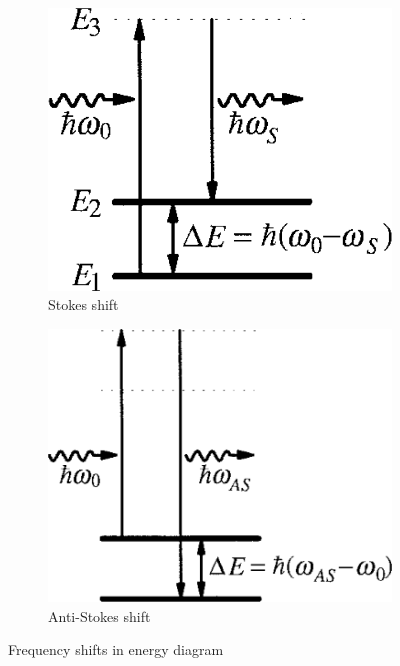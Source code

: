 \documentclass{standalone}
\begin{document}
\begin{figure}[h]
	\centering
	\begin{subfigure}[b]{0.35\textwidth}
		\includegraphics[width=\textwidth]{freq_shift_stokes.png}
		\caption{Stokes shift}
	\end{subfigure}
	\begin{subfigure}[b]{0.35\textwidth}
		\includegraphics[width=\textwidth]{freq_shift_antistokes.png}
		\caption{Anti-Stokes shift}
	\end{subfigure}
	\caption{Frequency shifts in energy diagram \cite{Farahani1999}}
	\label{fig:freq_shift}
\end{figure}
\end{document}
